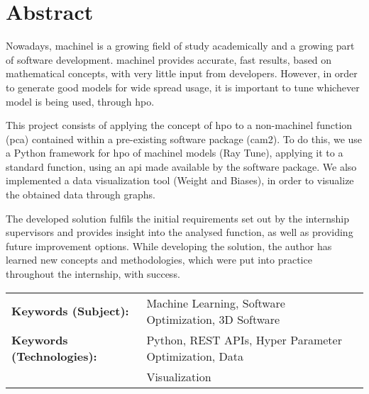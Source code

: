 
\section*{Abstract}

Nowadays, \acrfull{machinel} is a growing field of study academically and a growing part of software development. \acrshort{machinel} provides accurate, fast results, based on mathematical concepts, with very little input from developers. However, in order to generate good models for wide spread usage, it is important to tune whichever model is being used, through \acrfull{hpo}.

This project consists of applying the concept of \acrshort{hpo} to a non-\acrshort{machinel} function (\acrfull{pca}) contained within a pre-existing software package (\acrshort{cam2}). To do this, we use a Python framework for \acrshort{hpo} of \acrshort{machinel} models (Ray Tune), applying it to a standard function, using an \acrshort{api} made available by the software package. We also implemented a data visualization tool (Weight and Biases), in order to visualize the obtained data through graphs.

The developed solution fulfils the initial requirements set out by the internship supervisors and provides insight into the analysed function, as well as providing future improvement options. While developing the solution, the author has learned new concepts and methodologies, which were put into practice throughout the internship, with success.

\begin{table}[ht]
\begin{tabular}{ll}
\textbf{Keywords (Subject):}      & Machine Learning, Software Optimization, 3D Software \\
\textbf{Keywords (Technologies):} & Python, REST APIs, Hyper Parameter Optimization, Data \\ 								   & Visualization
\end{tabular}
\end{table}